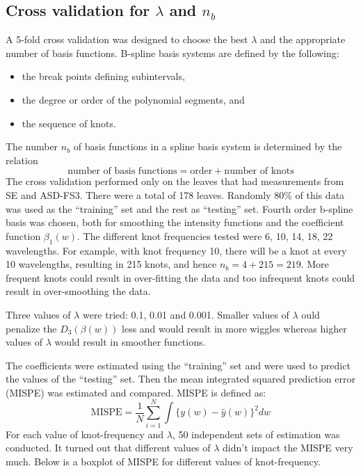 \subsection*{Cross validation for $\lambda$ and $n_b$}
A 5-fold cross validation was designed to choose the best $\lambda$ and the appropriate number of basis functions. B-spline basis systems are defined by the following:
\begin{itemize}
\item the break points defining subintervals,
\item the degree or order of the polynomial segments, and
\item the sequence of knots.
\end{itemize}
The number $n_b$ of basis functions in a spline basis system is determined by the relation
\[ \text{number of basis functions} = \text{order} + \text{number of knots} \]
The cross validation performed only on the leaves that had measurements from SE and ASD-FS3. There were a total of 178 leaves. Randomly 80\% of this data was used as the ``training'' set and the rest as ``testing'' set. Fourth order b-spline basis was chosen, both for smoothing the intensity functions and the coefficient function $\beta_1(w)$. The different knot frequencies tested were 6, 10, 14, 18, 22 wavelengths. For example, with knot frequency 10, there will be a knot at every 10 wavelengths, resulting in 215 knots, and hence $n_b = 4 + 215 = 219$. More frequent knots could result in over-fitting the data and too infrequent knots could result in over-smoothing the data.

Three values of $\lambda$ were tried: 0.1, 0.01 and 0.001. Smaller values of $\lambda$ ould penalize the $D_3(\beta(w))$ less and would result in more wiggles whereas higher values of $\lambda$ would result in smoother functions.

The coefficients were estimated using the ``training'' set and were used to predict the values of the ``testing'' set. Then the mean integrated squared prediction error (MISPE) was estimated and compared. MISPE is defined as:
\begin{equation}
\text{MISPE} = \frac{1}{N} \sum \limits_{i = 1} ^{N} \int \{y(w) - \hat{y}(w)\}^2dw
\end{equation}
For each value of knot-frequency and $\lambda$, 50 independent sets of estimation was conducted. It turned out that different values of $\lambda$ didn't impact the MISPE very much. Below is a boxplot of MISPE for different values of knot-frequency. 

